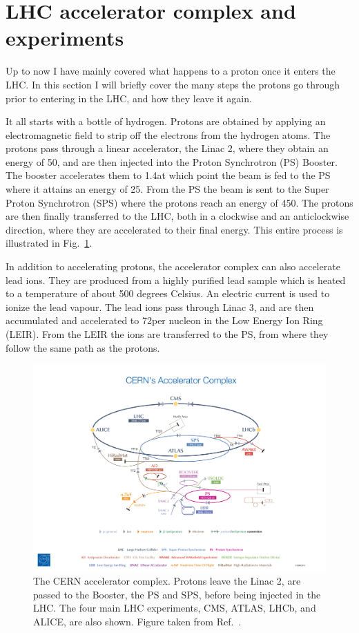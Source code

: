 \section{LHC accelerator complex and experiments}

Up to now I have mainly covered what happens to a proton once it enters the LHC. In this section I
will briefly cover the many steps the protons go through prior to entering in the LHC, and how they
leave it again. 

It all starts with a bottle of hydrogen. Protons are obtained by applying an electromagnetic field
to strip off the electrons from the hydrogen atoms. The protons pass through a linear accelerator,
the Linac 2, where they obtain an energy of 50\MeV, and are then injected into the Proton
Synchrotron (PS) Booster. The booster accelerates them to 1.4\GeV at which point the beam is fed to
the PS where it attains an energy of 25\GeV. From the PS the beam is sent to the Super Proton
Synchrotron (SPS) where the protons reach an energy of 450\GeV. 
The protons are then finally transferred to the LHC, both in a clockwise and an anticlockwise
direction, where they are accelerated to their final energy. This entire process is illustrated in
Fig.~\ref{fig:lhc_complex}. 

In addition to accelerating protons, the accelerator complex can also accelerate lead ions.
They are produced from a highly purified lead sample which is heated to a temperature of about
500 degrees Celsius. An electric current is used to ionize the lead vapour.
The lead ions pass through Linac 3, and are then accumulated and accelerated to 72\MeV per nucleon
in the Low Energy Ion Ring (LEIR). 
From the LEIR the ions are transferred to the PS, from where they follow the same path as the
protons. 

\begin{figure}[t]
  \centering
  \includegraphics[width=\textwidth,clip=true,trim=10cm 0 13cm 9cm]
  {figures/lhc/cern_accelerator_complex_cds1621583}
  \caption{The CERN accelerator complex. Protons leave the Linac 2, are passed to the Booster, the
PS and SPS, before being injected in the LHC. The four main LHC experiments, CMS, ATLAS, LHCb, and
ALICE, are also shown. Figure taken from Ref.~\cite{lhc_complex}.
  \label{fig:lhc_complex}}
\end{figure}


